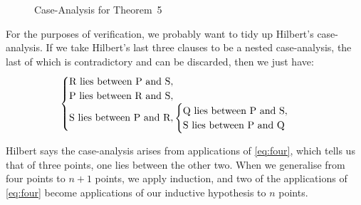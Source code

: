 \begin{figure}
\caption{Case-Analysis for Theorem~5}
\label{fig:Theorem5Cases}
\end{figure}

For the purposes of verification, we probably want to tidy up Hilbert's case-analysis. If we take Hilbert's last three clauses to be a nested case-analysis, the last of which is contradictory and can be discarded, then we just have:
\begin{displaymath}
\begin{cases}
$R$ \text{ lies between } $P$ \text{ and } $S$,\\
$P$ \text{ lies between } $R$ \text{ and } $S$,\\
$S$ \text{ lies between } $P$ \text{ and } $R$,
\begin{cases}
  $Q$ \text{ lies between } $P$ \text{ and } $S$,\\
  $S$ \text{ lies between } $P$ \text{ and } $Q$
\end{cases}
\end{cases}
\end{displaymath}

Hilbert says the case-analysis arises from applications of \ref{eq:four}, which tells us that of three points, one lies between the other two. When we generalise from four points to $n+1$ points, we apply induction, and two of the applications of \ref{eq:four} become applications of our inductive hypothesis to $n$ points.

